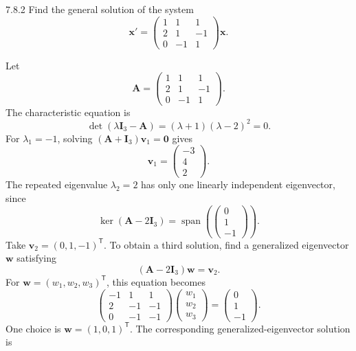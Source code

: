 \documentclass[11pt,oneside]{article}
\begin{document}

\begin{problem}{7.8.2}
Find the general solution of the system
\[
    \mathbf{x}'=
    \begin{pmatrix}
        1&1&1\\
        2&1&-1\\
        0&-1&1
    \end{pmatrix}\mathbf{x}.
\]
\end{problem}

\begin{solution}
Let
\[
    \mathbf{A}=\begin{pmatrix}1&1&1\\2&1&-1\\0&-1&1\end{pmatrix}.
\]
The characteristic equation is
\[
    \det(\lambda\mathbf{I}_3-\mathbf{A})
    =(\lambda+1)(\lambda-2)^2=0.
\]
For $\lambda_1=-1$, solving $(\mathbf{A}+\mathbf{I}_3)\mathbf{v}_1=\mathbf{0}$ gives
\[
    \mathbf{v}_1=\begin{pmatrix}-3\\4\\2\end{pmatrix}.
\]
The repeated eigenvalue $\lambda_2=2$ has only one linearly independent eigenvector, since
\[
    \ker(\mathbf{A}-2\mathbf{I}_3)
    =\operatorname{span}\!\left(\begin{pmatrix}0\\1\\-1\end{pmatrix}\right).
\]
Take $\mathbf{v}_2=(0,1,-1)^{\mathsf T}$. To obtain a third solution, find a generalized eigenvector $\mathbf{w}$ satisfying
\[
    (\mathbf{A}-2\mathbf{I}_3)\mathbf{w}=\mathbf{v}_2.
\]
For $\mathbf{w}=(w_1,w_2,w_3)^{\mathsf T}$, this equation becomes
\[
    \begin{pmatrix}-1&1&1\\2&-1&-1\\0&-1&-1\end{pmatrix}
    \begin{pmatrix}w_1\\w_2\\w_3\end{pmatrix}
    =\begin{pmatrix}0\\1\\-1\end{pmatrix}.
\]
One choice is $\mathbf{w}=(1,0,1)^{\mathsf T}$. The corresponding generalized-eigenvector solution is

\end{solution}
\end{document}
